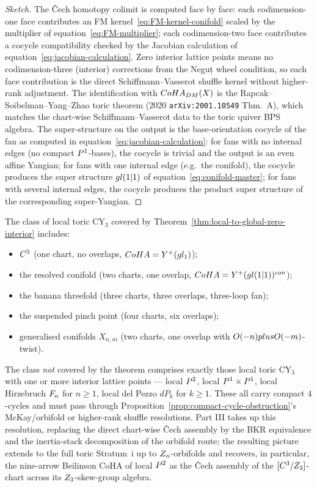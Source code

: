 \begin{proof}[Sketch]
The \v{C}ech homotopy colimit is computed face by face: each
codimension-one face contributes an FM kernel~\eqref{eq:FM-kernel-conifold}
scaled by the multiplier of equation~\eqref{eq:FM-multiplier}; each
codimension-two face contributes a cocycle compatibility checked by
the Jacobian calculation of equation~\eqref{eq:jacobian-calculation}.
Zero interior lattice points means no codimension-three (interior)
corrections from the Neguț wheel condition, so each face contribution is
the direct Schiffmann--Vasserot shuffle kernel without higher-rank
adjustment.  The identification with $CoHA_{DM}(X)$ is the
Rapcak--Soibelman--Yang--Zhao toric theorem (2020
\texttt{arXiv:2001.10549} Thm.~A), which matches the chart-wise
Schiffmann--Vasserot data to the toric quiver BPS algebra.  The
super-structure on the output is the base-orientation cocycle of the
fan as computed in equation~\eqref{eq:jacobian-calculation}: for fans
with no internal edges (no compact $P^1$-bases), the cocycle is
trivial and the output is an even affine Yangian; for fans with one
internal edge (e.g.\ the conifold), the cocycle produces the super
structure $gl(1|1)$ of equation~\eqref{eq:conifold-master};
for fans with several internal edges, the cocycle produces the product
super structure of the corresponding super-Yangian.
\end{proof}

The class of local toric CY$_3$ covered by
Theorem~\ref{thm:local-to-global-zero-interior} includes:
\begin{itemize}
\item $C^3$ (one chart, no overlaps, $CoHA = Y^+(gl_1)$);
\item the resolved conifold (two charts, one overlap,
  $CoHA = Y^+(gl(1|1))^{con}$);
\item the banana threefold (three charts, three overlaps, three-loop fan);
\item the suspended pinch point (four charts, six overlaps);
\item generalised conifolds $X_{n, m}$ (two charts, one overlap with
  $O(-n) plus O(-m)$-twist).
\end{itemize}

The class \emph{not} covered by the theorem comprises exactly those local
toric CY$_3$ with one or more interior lattice points --- local $P^2$,
local $P^1 \times P^1$, local Hirzebruch $F_n$ for $n \geq 1$, local
del Pezzo $dP_k$ for $k \geq 1$.  These all carry compact $4$-cycles and
must pass through Proposition~\ref{prop:compact-cycle-obstruction}'s
McKay/orbifold or higher-rank shuffle resolutions.  Part III takes up
this resolution, replacing the direct chart-wise \v{C}ech assembly by the
BKR equivalence and the inertia-stack decomposition of the orbifold
route; the resulting picture extends to the full toric Stratum~i up to
$Z_n$-orbifolds and recovers, in particular, the nine-arrow Beilinson
CoHA of local $P^2$ as the \v{C}ech assembly of the $[C^3/Z_3]$-chart
across its $Z_3$-skew-group algebra.

